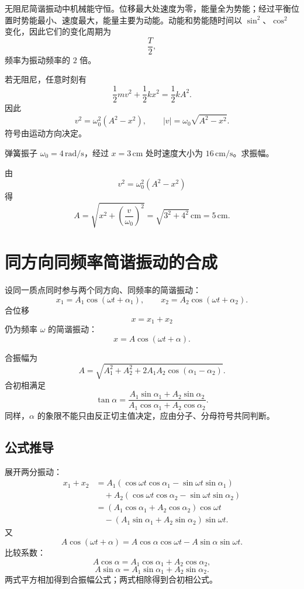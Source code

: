 \begin{theorem}[能量转化规律]\label{thm:energy-shm}
无阻尼简谐振动中机械能守恒。位移最大处速度为零，能量全为势能；经过平衡位置时势能最小、速度最大，能量主要为动能。动能和势能随时间以 $\sin^2$、$\cos^2$ 变化，因此它们的变化周期为
\[
  \frac{T}{2},
\]
频率为振动频率的 $2$ 倍。
\end{theorem}

\begin{method}[用能量反求振幅或速度]
若无阻尼，任意时刻有
\[
  \frac12mv^2+\frac12kx^2=\frac12kA^2.
\]
因此
\[
  v^2=\omega_0^2(A^2-x^2),\qquad
  |v|=\omega_0\sqrt{A^2-x^2}.
\]
符号由运动方向决定。
\end{method}

\begin{example}[title={由某处速度求振幅}]\label{eg:energy-example}
弹簧振子 $\omega_0=4\,\mathrm{rad/s}$，经过 $x=3\,\mathrm{cm}$ 处时速度大小为 $16\,\mathrm{cm/s}$。求振幅。

\begin{solution}
由
\[
  v^2=\omega_0^2(A^2-x^2)
\]
得
\[
  A=\sqrt{x^2+\left(\frac{v}{\omega_0}\right)^2}
  =\sqrt{3^2+4^2}\,\mathrm{cm}=5\,\mathrm{cm}.
\]
\end{solution}
\end{example}

\section{同方向同频率简谐振动的合成}

设同一质点同时参与两个同方向、同频率的简谐振动：
\[
  x_1=A_1\cos(\omega t+\alpha_1),\qquad
  x_2=A_2\cos(\omega t+\alpha_2).
\]
合位移
\[
  x=x_1+x_2
\]
仍为频率 $\omega$ 的简谐振动：
\[
  x=A\cos(\omega t+\alpha).
\]

\begin{theorem}[同向同频合成公式]\label{thm:same-frequency-sum}
合振幅为
\[
  A=\sqrt{A_1^2+A_2^2+2A_1A_2\cos(\alpha_1-\alpha_2)}.
\]
合初相满足
\[
  \tan\alpha=
  \frac{A_1\sin\alpha_1+A_2\sin\alpha_2}
       {A_1\cos\alpha_1+A_2\cos\alpha_2}.
\]
同样，$\alpha$ 的象限不能只由反正切主值决定，应由分子、分母符号共同判断。
\end{theorem}

\subsection*{公式推导}

展开两分振动：
\[
\begin{aligned}
x_1+x_2
&=A_1(\cos\omega t\cos\alpha_1-\sin\omega t\sin\alpha_1)\\
&\quad +A_2(\cos\omega t\cos\alpha_2-\sin\omega t\sin\alpha_2)\\
&=(A_1\cos\alpha_1+A_2\cos\alpha_2)\cos\omega t\\
&\quad -(A_1\sin\alpha_1+A_2\sin\alpha_2)\sin\omega t.
\end{aligned}
\]
又
\[
  A\cos(\omega t+\alpha)=A\cos\alpha\cos\omega t-A\sin\alpha\sin\omega t.
\]
比较系数：
\[
  A\cos\alpha=A_1\cos\alpha_1+A_2\cos\alpha_2,
\]
\[
  A\sin\alpha=A_1\sin\alpha_1+A_2\sin\alpha_2.
\]
两式平方相加得到合振幅公式；两式相除得到合初相公式。

